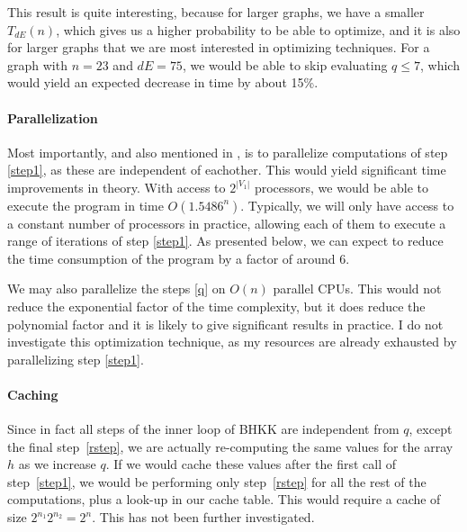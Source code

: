 \documentclass[a4paper]{article}
\begin{document}
This result is quite interesting, because for larger graphs, we have a smaller $T_{dE}(n)$, which gives us a higher probability to be able to optimize, and it is also for larger graphs that we are most interested in optimizing techniques. For a graph with $n=23$ and $dE = 75$, we would be able to skip evaluating $q\leq7$, which would yield an expected decrease in time by about 15\%\footnotemark. %


\paragraph{Parallelization} Most importantly, and also mentioned in \cite{cov_pack}, is to parallelize computations of step \ref{step1}, as these are independent of eachother. This would yield significant time improvements in theory. With access to $2^{|V_1|}$ processors, we would be able to execute the program in time $O(1.5486^n)$. Typically, we will only have access to a constant number of processors in practice, allowing each of them to execute a range of iterations of step \ref{step1}. As presented below, we can expect to reduce the time consumption of the program by a factor of around 6. %

We may also parallelize the steps \ref{q} on $O(n)$ parallel CPUs. This would not reduce the exponential factor of the time complexity, but it does reduce the polynomial factor and it is likely to give significant results in practice. I do not investigate this optimization technique, as my resources are already exhausted by parallelizing step \ref{step1}.

\paragraph{Caching} Since in fact all steps of the inner loop of BHKK are independent from $q$, except the final step~\ref{rstep}, we are actually re-computing the same values for the array $h$ as we increase $q$. If we would cache these values after the first call of step~\ref{step1}, we would be performing only step~\ref{rstep} for all the rest of the computations, plus a look-up in our cache table. This would require a cache of size $2^{n_1} 2^{n_2} = 2^n$. This has not been further investigated.
\end{document}
